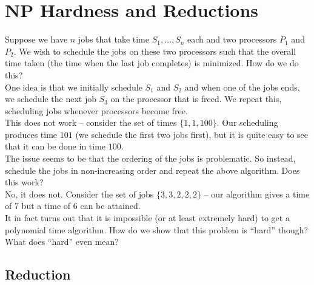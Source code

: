\section{NP Hardness and Reductions}

Suppose we have $n$ jobs that take time $S_1,\ldots,S_n$ each and two processors $P_1$ and $P_2$. We wish to schedule the jobs on these two processors such that the overall time taken (the time when the last job completes) is minimized. How do we do this?\\

One idea is that we initially schedule $S_1$ and $S_2$ and when one of the jobs ends, we schedule the next job $S_3$ on the processor that is freed. We repeat this, scheduling jobs whenever processors become free.\\
This does not work -- consider the set of times $\{1,1,100\}$. Our scheduling produces time $101$ (we schedule the first two jobs first), but it is quite easy to see that it can be done in time $100$.\\

The issue seems to be that the ordering of the jobs is problematic. So instead, schedule the jobs in non-increasing order and repeat the above algorithm. Does this work?\\
No, it does not. Consider the set of jobs $\{3,3,2,2,2\}$ -- our algorithm gives a time of $7$ but a time of $6$ can be attained.\\

It in fact turns out that it is impossible (or at least extremely hard) to get a polynomial time algorithm. How do we show that this problem is ``hard'' though? What does ``hard'' even mean?\\

\subsection{Reduction}

